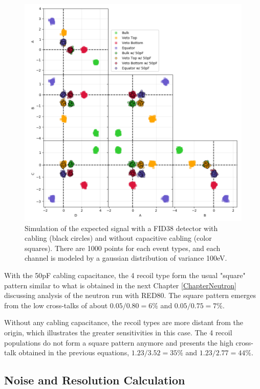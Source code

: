 \begin{figure}
\centering
\includegraphics[width=\linewidth]{Figures/Electrodes/predict_corner_plot.png}
\caption{Simulation of the expected signal with a FID38 detector with cabling (black circles) and without capacitive cabling (color squares). There are 1000 points for each event types, and each channel is modeled by a gaussian distribution of variance 100eV.}
\label{fig:predict-corner-plot}
\end{figure}

With the 50pF cabling capacitance, the 4 recoil type form the usual "square" pattern similar to what is obtained in the next Chapter \ref{ChapterNeutron} discussing analysis of the neutron run with RED80. The square pattern emerges from the low cross-talks of about $0.05/0.80=6\%$ and $0.05/0.75=7\%$.

Without any cabling capacitance, the recoil types are more distant from the origin, which illustrates the greater sensitivities in this case. The 4 recoil populations do not form a square pattern anymore and presents the high cross-talk obtained in the previous equations, $1.23/3.52=35\%$ and $1.23/2.77=44\%$.


\subsection{Noise and Resolution Calculation}

